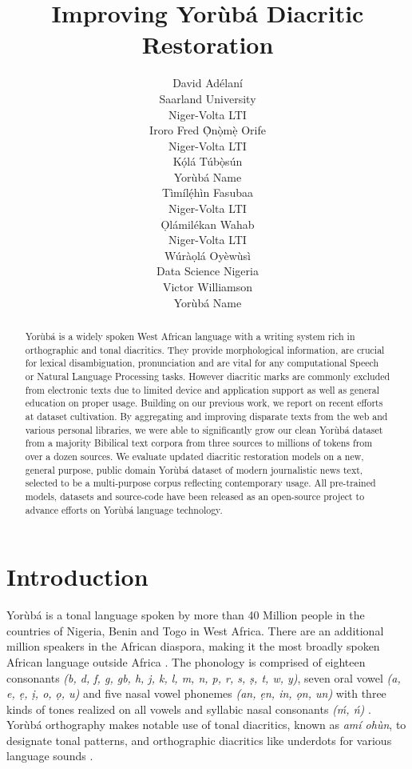 \documentclass{article} %
\title{Improving Yor{\`u}b{\'a} Diacritic Restoration}
\author{David Ad{\'e}lan{\'i} \\
Saarland University\\
Niger-Volta LTI \\
\And
Iroro Fred \d{\`O}n\d{\`o}m\d{\`e} Orife \\
Niger-Volta LTI\\
\And
K\d{\'{o}}l\'{a} T\'{u}b\d{\`{o}}s\'{u}n \\
Yor{\`u}b{\'a} Name \\
\And
T{\`i}m{\'i}l\d{\'{e}}h{\`i}n Fasubaa \\
Niger-Volta LTI \\
\And
\d{O}l{\'a}mil{\'e}kan Wahab \\
Niger-Volta LTI \\
\And
W{\'u}r{\`a}\d{o}l{\'a} Oy{\`e}w{\`u}s{\`i} \\
Data Science Nigeria \\
\And
Victor Williamson \\
Yor{\`u}b{\'a} Name \\
}
\begin{document}
\maketitle

\begin{abstract}
Yor{\`u}b{\'a} is a widely spoken West African language with a writing system rich in orthographic and tonal diacritics. They provide morphological information, are crucial for lexical disambiguation, pronunciation and are vital for any computational Speech or Natural Language Processing  tasks. However diacritic marks are commonly excluded from electronic texts due to limited device and application support as well as general education on proper usage. Building on our previous work, we report on recent efforts at dataset cultivation. By aggregating and improving disparate texts from the web and various personal libraries, we were able to significantly grow our clean Yor{\`u}b{\'a} dataset from a majority Bibilical text corpora from three sources to millions of tokens from over a dozen sources. We evaluate updated diacritic restoration models on a new, general purpose, public domain Yor{\`u}b{\'a} dataset of modern journalistic news text, selected to be a multi-purpose corpus reflecting contemporary usage. All pre-trained models, datasets and source-code have been released as an open-source project to advance efforts on Yor{\`u}b{\'a} language technology.\\
\end{abstract}

\section{Introduction}\label{sec:introduction}

Yor{\`u}b{\'a} is a tonal language spoken by more than 40 Million people in the countries of Nigeria, Benin and Togo in West Africa. There are an additional million speakers in the African diaspora, making it the most broadly spoken African language outside Africa \citep{yoruba_language}. The phonology is comprised of eighteen consonants \emph{({b}, {d}, {f}, {g}, {gb}, {h}, {j}, {k}, {l}, {m}, {n}, {p}, {r}, {s}, \d{s}, {t}, {w}, y)}, seven oral vowel \emph{({a}, {e}, \d{e}, \d{i}, {o}, \d{o}, {u})} and five nasal vowel phonemes \emph{({an}, \d{e}{n}, {in}, \d{o}{n}, {un})} with three kinds of tones realized on all vowels and syllabic nasal consonants \emph{({\'m}, {\'n})} \citep{akinlabi2004sound}. Yor{\`u}b{\'a} orthography makes notable use of tonal diacritics, known as \emph{am{\'i} oh{\`u}n}, to designate tonal patterns, and orthographic diacritics like underdots for various language sounds \citep{adegbola2012quantifying, wells2000orthographic}.
\end{document}
